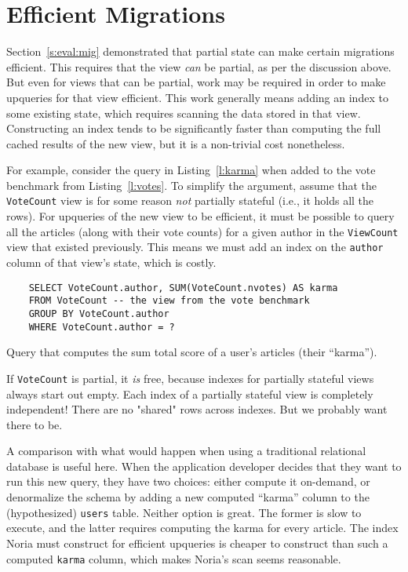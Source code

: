 \section{Efficient Migrations}

Section~\ref{s:eval:mig} demonstrated that partial state can make certain
migrations efficient. This requires that the view \emph{can} be partial, as
per the discussion above. But even for views that can be partial, work may be
required in order to make upqueries for that view efficient. This work generally
means adding an index to some existing state, which requires scanning the data
stored in that view. Constructing an index tends to be significantly faster than
computing the full cached results of the new view, but it is a non-trivial cost
nonetheless.

For example, consider the query in Listing~\vref{l:karma} when added to the vote
benchmark from Listing~\vref{l:votes}. To simplify the argument, assume that the
\texttt{VoteCount} view is for some reason \emph{not} partially stateful (i.e.,
it holds all the rows). For upqueries of the new view to be efficient, it must
be possible to query all the articles (along with their vote counts) for a given
author in the \texttt{ViewCount} view that existed previously. This means we
must add an index on the \texttt{author} column of that view's state, which is
costly.

\begin{listing}[h]
  \begin{verbatim}
    SELECT VoteCount.author, SUM(VoteCount.nvotes) AS karma
    FROM VoteCount -- the view from the vote benchmark
    GROUP BY VoteCount.author
    WHERE VoteCount.author = ?
  \end{verbatim}
  \caption{Query that computes the sum total score of a user's articles
  (their ``karma'').}
  \label{l:karma}
\end{listing}

\begin{inprogress}
  If \texttt{VoteCount} is partial, it \emph{is} free, because indexes for
  partially stateful views always start out empty. Each index of a partially
  stateful view is completely independent! There are no "shared" rows across
  indexes. But we probably want there to be.
\end{inprogress}

A comparison with what would happen when using a traditional relational database
is useful here. When the application developer decides that they want to run
this new query, they have two choices: either compute it on-demand, or
denormalize the schema by adding a new computed ``karma'' column to the
(hypothesized) \texttt{users} table. Neither option is great. The former is slow
to execute, and the latter requires computing the karma for every article.
The index Noria must construct for efficient upqueries is cheaper to construct
than such a computed \texttt{karma} column, which makes Noria's scan seems
reasonable.

